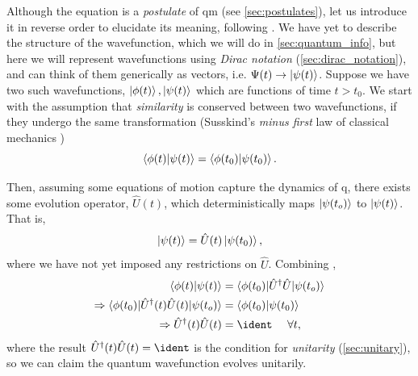 Although the \schrodinger equation is a \emph{postulate} of \gls{qm} (see \cref{sec:postulates}), 
    let us introduce it in reverse order to elucidate its meaning, following \cite{susskind2014quantum}. 
We have yet to describe the structure of the wavefunction, which we will do in \cref{sec:quantum_info},
    but here we will represent wavefunctions using \emph{Dirac notation} (\cref{sec:dirac_notation}), 
    and can think of them generically as vectors, i.e. $\Psi(t) \rightarrow \ket{\psi(t)}$. 
Suppose we have two such wavefunctions, $\ket{\phi(t)}, \ket{\psi(t)}$ which are functions of time $t > t_0$.
We start with the assumption that \emph{similarity} is conserved between two wavefunctions,
    if they undergo the same transformation 
    (Susskind's \emph{minus first} law of classical mechanics \cite{susskind2014quantum})
\begin{equation}
    \label{eqn:conservation_simularity}
    \braket{\phi(t) | \psi(t)} = \braket{\phi(t_0) | \psi(t_0)}.
\end{equation}

Then, assuming some equations of motion capture the dynamics of \gls{q}, 
    there exists some evolution operator, $\hat{U}(t)$, which deterministically maps $\ket{\psi(t_o)}$ to $\ket{\psi(t)}$.
That is, 
\begin{equation}
    \label{eqn:unitary_time_evolution}
    \ket{\psi(t)} = \hat{U}(t) \ket{\psi(t_0)},
\end{equation}
    where we have not yet imposed any restrictions on $\hat{U}$. 
Combining , 
\begin{equation}
    \begin{split}
        \braket{\phi(t) | \psi(t)} &= \braket{ \phi(t_0) | \hat{U}^{\dag} \hat{U}| \psi(t_o) }
        \\
        \Rightarrow \braket{ \phi(t_0) | \hat{U}^{\dag}(t) \hat{U}(t) | \psi(t_o) } &= \braket{\phi(t_0) | \psi(t_0)}
        \\
        \Rightarrow \hat{U}^{\dag}(t) \hat{U}(t) &= \ident \ \ \ \ \forall t,
    \end{split}
\end{equation}
where the result $\hat{U}^{\dag}(t) \hat{U}(t) = \ident$ is the condition for \emph{unitarity} (\cref{sec:unitary}), 
    so we can claim the quantum wavefunction evolves unitarily. 
\par 

